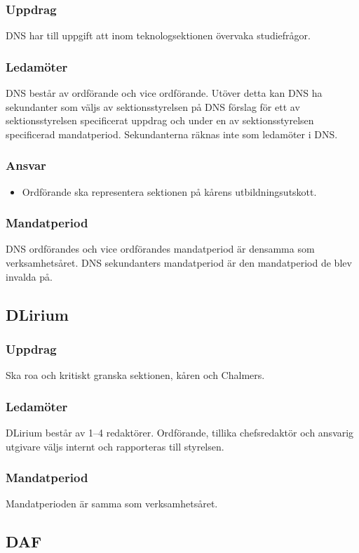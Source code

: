 \subsubsection{Uppdrag}
DNS har till uppgift att inom teknologsektionen övervaka studiefrågor.
\subsubsection{Ledamöter}
DNS består av ordförande och vice ordförande. Utöver detta kan DNS ha sekundanter som väljs av sektionsstyrelsen på DNS förslag för ett av sektionsstyrelsen specificerat uppdrag och under en av sektionsstyrelsen specificerad mandatperiod. Sekundanterna räknas inte som ledamöter i DNS.
\subsubsection{Ansvar}
\begin{itemize}
  \item Ordförande ska representera sektionen på kårens utbildningsutskott.
\end{itemize}
\subsubsection{Mandatperiod}
DNS ordförandes och vice ordförandes mandatperiod är densamma som verksamhetsåret. DNS sekundanters mandatperiod är den mandatperiod de blev invalda på.

\subsection{DLirium}
\subsubsection{Uppdrag}
Ska roa och kritiskt granska sektionen, kåren och Chalmers. 
\subsubsection{Ledamöter}
DLirium består av 1--4 redaktörer. Ordförande, tillika chefsredaktör och ansvarig utgivare väljs internt och rapporteras till styrelsen.
\subsubsection{Mandatperiod}
Mandatperioden är samma som verksamhetsåret. 

\subsection{DAF}
